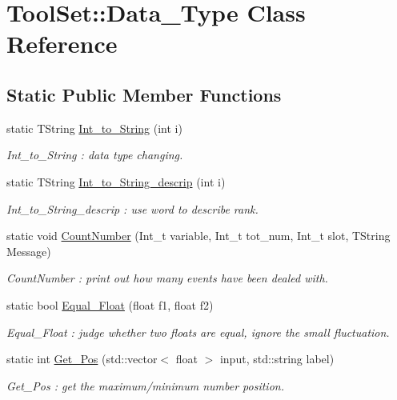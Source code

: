 \hypertarget{classToolSet_1_1Data__Type}{
\section{ToolSet::Data\_\-Type Class Reference}
\label{classToolSet_1_1Data__Type}
}
\subsection*{Static Public Member Functions}
\begin{DoxyCompactItemize}
\item 
static TString \hyperlink{classToolSet_1_1Data__Type_a5a180aac27b1ffee7f3986ee49a36fe4}{Int\_\-to\_\-String} (int i)
\begin{DoxyCompactList}\small\item\em Int\_\-to\_\-String : data type changing. \item\end{DoxyCompactList}\item 
static TString \hyperlink{classToolSet_1_1Data__Type_a4fc26a3b641aac7be524a433a382b441}{Int\_\-to\_\-String\_\-descrip} (int i)
\begin{DoxyCompactList}\small\item\em Int\_\-to\_\-String\_\-descrip : use word to describe rank. \item\end{DoxyCompactList}\item 
static void \hyperlink{classToolSet_1_1Data__Type_ab9c3d77c777ef08fca543e1681472577}{CountNumber} (Int\_\-t variable, Int\_\-t tot\_\-num, Int\_\-t slot, TString Message)
\begin{DoxyCompactList}\small\item\em CountNumber : print out how many events have been dealed with. \item\end{DoxyCompactList}\item 
static bool \hyperlink{classToolSet_1_1Data__Type_abb19683e0fa26bb65912ede69367587a}{Equal\_\-Float} (float f1, float f2)
\begin{DoxyCompactList}\small\item\em Equal\_\-Float : judge whether two floats are equal, ignore the small fluctuation. \item\end{DoxyCompactList}\item 
static int \hyperlink{classToolSet_1_1Data__Type_af1b26e30319e2a924f2b110c7e42b16c}{Get\_\-Pos} (std::vector$<$ float $>$ input, std::string label)
\begin{DoxyCompactList}\small\item\em Get\_\-Pos : get the maximum/minimum number position. \item\end{DoxyCompactList}\end{DoxyCompactItemize}


